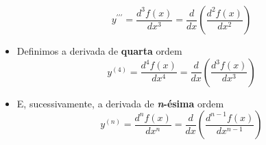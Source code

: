\begin{frame}
\begin{columns}[onlytextwidth]
\begin{column}{0.5\textwidth}
\begin{itemize}
\begin{equation*}
          y^{\prime\prime\prime} = \frac{d^{3}f(x)}{dx^{3}} = \frac{d}{dx}\left( \frac{d^{2}f(x)}{dx^{2}} \right)
        \end{equation*}
        \item Definimos a derivada de \textbf{quarta} ordem\vspace{-0.2cm}
        \begin{equation*}
          y^{(4)} = \frac{d^{4}f(x)}{dx^{4}} = \frac{d}{dx}\left( \frac{d^{3}f(x)}{dx^{3}} \right)
        \end{equation*}
        \item E, sucessivamente, a derivada de \textbf{\emph{n}-ésima} ordem\vspace{-0.2cm}
        \begin{equation*}
          y^{(n)} = \frac{d^{n}f(x)}{dx^{n}} = \frac{d}{dx}\left( \frac{d^{n-1}f(x)}{dx^{n-1}} \right)
        \end{equation*}
      \end{itemize}
    \end{column}
  \end{columns}
\end{frame}

